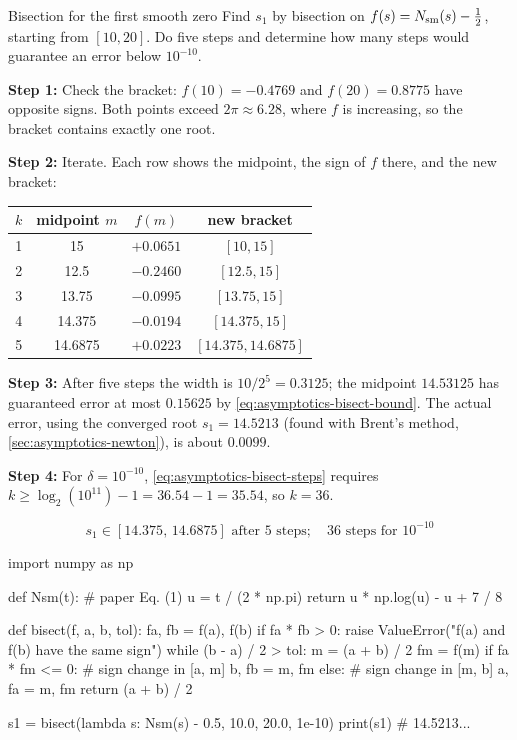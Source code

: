\begin{sample}{Bisection for the first smooth zero}
Find $s_1$ by bisection on $f(s)=N_{\mathrm{sm}}(s)-\tfrac12$, starting from $[10,20]$. Do five steps and determine how many steps would guarantee an error below $10^{-10}$.

\textbf{Step 1:} Check the bracket: $f(10)=-0.4769$ and $f(20)=0.8775$ have opposite signs. Both points exceed $2\pi\approx6.28$, where $f$ is increasing, so the bracket contains exactly one root.

\textbf{Step 2:} Iterate. Each row shows the midpoint, the sign of $f$ there, and the new bracket:
\begin{center}
\begin{tabular}{cccc}
\toprule
$k$ & midpoint $m$ & $f(m)$ & new bracket\\
\midrule
1 & 15 & $+0.0651$ & $[10,15]$\\
2 & 12.5 & $-0.2460$ & $[12.5,15]$\\
3 & 13.75 & $-0.0995$ & $[13.75,15]$\\
4 & 14.375 & $-0.0194$ & $[14.375,15]$\\
5 & 14.6875 & $+0.0223$ & $[14.375,14.6875]$\\
\bottomrule
\end{tabular}
\end{center}

\textbf{Step 3:} After five steps the width is $10/2^5=0.3125$; the midpoint $14.53125$ has guaranteed error at most $0.15625$ by \cref{eq:asymptotics-bisect-bound}. The actual error, using the converged root $s_1=14.5213$ (found with Brent's method, \cref{sec:asymptotics-newton}), is about $0.0099$.

\textbf{Step 4:} For $\delta=10^{-10}$, \cref{eq:asymptotics-bisect-steps} requires $k\ge\log_2(10^{11})-1=36.54-1=35.54$, so $k=36$.

\[
\boxed{s_1\in[14.375,\,14.6875]\text{ after 5 steps};\quad 36\text{ steps for }10^{-10}}
\]
\end{sample}

\begin{pycode}
import numpy as np

def Nsm(t):                          # paper Eq. (1)
    u = t / (2 * np.pi)
    return u * np.log(u) - u + 7 / 8

def bisect(f, a, b, tol):
    fa, fb = f(a), f(b)
    if fa * fb > 0:
        raise ValueError("f(a) and f(b) have the same sign")
    while (b - a) / 2 > tol:
        m = (a + b) / 2
        fm = f(m)
        if fa * fm <= 0:             # sign change in [a, m]
            b, fb = m, fm
        else:                        # sign change in [m, b]
            a, fa = m, fm
    return (a + b) / 2

s1 = bisect(lambda s: Nsm(s) - 0.5, 10.0, 20.0, 1e-10)
print(s1)                            # 14.5213...
\end{pycode}

